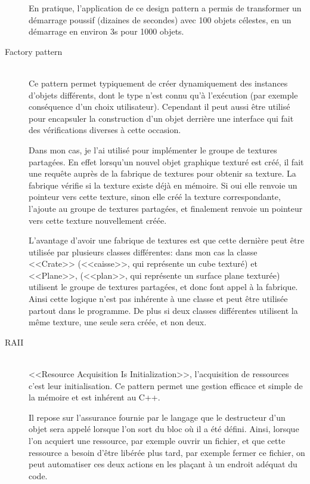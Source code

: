\documentclass[a4paper,french,12pt]{article}
\begin{document}
\begin{description}
	      En pratique, l'application de ce design pattern a permis de transformer un démarrage poussif (dizaines de secondes) avec 100 objets célestes,
	      en un démarrage en environ 3s pour 1000 objets.

	    \item [Factory pattern]~\\
	      Ce pattern permet typiquement de créer dynamiquement des instances d'objets différents, dont le type
	      n'est connu qu'à l'exécution (par exemple conséquence d'un choix utilisateur).
	      Cependant il peut aussi être utilisé pour encapsuler la construction d'un objet derrière une interface
	      qui fait des vérifications diverses à cette occasion.

	      Dans mon cas, je l'ai utilisé pour implémenter le groupe de textures partagées. En effet lorsqu'un nouvel
	      objet graphique texturé est créé, il fait une requête auprès de la fabrique de textures pour obtenir sa texture.
	      La fabrique vérifie si la texture existe déjà en mémoire.
	      Si oui elle renvoie un pointeur vers cette texture, sinon elle créé la texture correspondante, l'ajoute
	      au groupe de textures partagées, et finalement renvoie un pointeur vers cette texture nouvellement créée.

	      L'avantage d'avoir une fabrique de textures est que cette dernière peut être utilisée par plusieurs classes
	      différentes: dans mon cas la classe <<Crate>> (<<caisse>>, qui représente un cube texturé) et <<Plane>>,
	      (<<plan>>, qui représente un surface plane texturée) utilisent le groupe de textures partagées, et donc
	      font appel à la fabrique.
	      Ainsi cette logique n'est pas inhérente à une classe et peut être utilisée partout dans le programme.
	      De plus si deux classes différentes utilisent la même texture, une seule sera créée, et non deux.

	    \item [RAII]~\\
	      \label{RAII}
	      <<Resource Acquisition Is Initialization>>, l'acquisition de ressources c'est leur initialisation.
	      Ce pattern permet une gestion efficace et simple de la mémoire et est inhérent au C++.

	      Il repose sur l'assurance fournie par le langage que le destructeur d'un objet sera appelé lorsque l'on
	      sort du bloc où il a été défini.
	      Ainsi, lorsque l'on acquiert une ressource, par exemple ouvrir un fichier, et que cette ressource a besoin
	      d'être libérée plus tard, par exemple fermer ce fichier, on peut automatiser ces deux actions en les plaçant
	      à un endroit adéquat du code.


\end{description}
\end{document}
